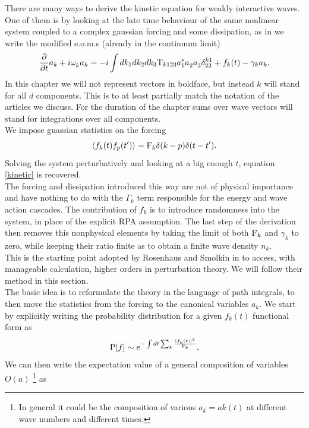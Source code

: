 There are many ways to derive the kinetic equation for weakly interactive waves. One of them is by looking at the late time behaviour of the same nonlinear system
coupled to a complex gaussian forcing and some dissipation, as in \cite{Zakharov1975} we write the modified e.o.m.s (already in the continuum limit)
\begin{equation}
    \frac{\partial}{\partial t} a_k + i \omega^{}_k a_k = -i \int dk_1 dk_2 dk_3 \mathrm{T}_{k123} a_1^*a_2^{}a_3^{} \delta^{k1}_{23} + f_k(t) - \gamma_k a_k.
    \label{eoms}
\end{equation}
In this chapter we will not represent vectors in boldface, but instead $k$ will stand for all $d$ components. This is to at least partially match the 
notation of the articles we discuss. For the duration of the chapter sums over wave vectors will stand for integrations over all components. \\ 
We impose guassian statistics on the forcing
\begin{equation}
    \langle f_k(t)f_p(t')\rangle = \mathrm{F}_k \delta(k-p)\delta(t-t').
\end{equation}
Solving the system perturbatively and looking at a big enough $t$, equation \eqref{kinetic} is recovered. \\
The forcing and dissipation introduced this way are not of physical importance and have nothing to do with the $\Gamma_k$ term responsible 
for the energy and wave action cascades. The contribution of $f_k$ is to introduce randomness into the system, in place of the explicit RPA assumption. 
The last step of the derivation then removes this nonphysical elements by taking the limit of both $\mathrm{F}_k$ and $\gamma_k$ to zero, while keeping their ratio finite as
to obtain a finite wave density $n_k$. \\  
This is the starting point adopted by Rosenhaus and Smolkin in \cite{Rosenhaus2023} to access, with manageable calculation, higher orders in perturbation theory. We will 
follow their method in this section.\\
The basic idea is to reformulate the theory in the language of path integrals, to then move the statistics from the forcing to the canonical variables $a_k^{}$. We start by
explicitly writing the probability distribution for a given $f_k(t)$ functional form as 
\begin{equation}  
    \mathrm{P}[f] \sim e^{-\int dt \sum_k \frac{|f_k(t)|^2}{\mathrm{F}_k}},
\end{equation}
We can then write the expectation value of a general composition of variables $O(a)$ \footnote{
    In general it could be the composition of various $a_k^{} = ak(t)$ at different wave numbers and different times.
} as 
